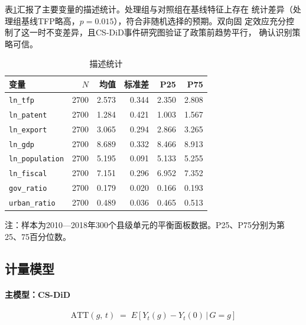 \documentclass[12pt, a4paper]{article}
\begin{document}
表\ref{tab:desc}汇报了主要变量的描述统计。处理组与对照组在基线特征上存在
统计差异（处理组基线TFP略高，$p=0.015$），符合非随机选择的预期。双向固
定效应充分控制了这一时不变差异，且CS-DiD事件研究图验证了政策前趋势平行，
确认识别策略可信。

\begin{table}[htbp]
\centering
\caption{描述统计}
\label{tab:desc}
\begin{threeparttable}
\begin{tabular}{lrrrrr}
\toprule
变量 & $N$ & 均值 & 标准差 & P25 & P75 \\
\midrule
\texttt{ln\_tfp} & 2700 & 2.573 & 0.344 & 2.350 & 2.808 \\
\texttt{ln\_patent} & 2700 & 1.284 & 0.421 & 1.003 & 1.567 \\
\texttt{ln\_export} & 2700 & 3.065 & 0.294 & 2.866 & 3.265 \\
\texttt{ln\_gdp} & 2700 & 8.689 & 0.332 & 8.466 & 8.913 \\
\texttt{ln\_population} & 2700 & 5.195 & 0.091 & 5.133 & 5.255 \\
\texttt{ln\_fiscal} & 2700 & 7.151 & 0.296 & 6.952 & 7.352 \\
\texttt{gov\_ratio} & 2700 & 0.179 & 0.020 & 0.166 & 0.193 \\
\texttt{urban\_ratio} & 2700 & 0.489 & 0.036 & 0.465 & 0.513 \\
\bottomrule
\end{tabular}
\begin{tablenotes}\small
\item 注：样本为2010—2018年300个县级单元的平衡面板数据。P25、P75分别为第
  25、75百分位数。
\end{tablenotes}
\end{threeparttable}
\end{table}

\subsection{计量模型}

\paragraph{主模型：CS-DiD \citep{callaway2021difference}}

\begin{equation}
\text{ATT}(g,\,t) \;=\; E\!\left[Y_t(g) - Y_t(0)\,\Big|\,G = g\right]
\end{equation}
\end{document}
